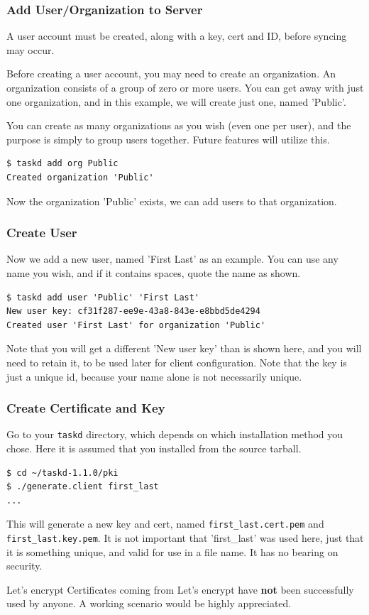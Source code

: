 \documentclass[t,handout]{beamer}
\begin{document}
\begin{frame}[fragile]\frametitle{Add User/Organization to Server}

    A user account must be created, along with a key, cert and ID, before syncing may occur.

    Before creating a user account, you may need to create an organization. An organization consists of a group of zero or more users. You can get away with just one organization, and in this example, we will create just one, named 'Public'.

    You can create as many organizations as you wish (even one per user), and the purpose is simply to group users together. Future features will utilize this.

    \begin{lstlisting}
$ taskd add org Public
Created organization 'Public'\end{lstlisting}

  Now the organization 'Public' exists, we can add users to that organization.
\end{frame}

\begin{frame}[fragile]\frametitle{Create User}
    Now we add a new user, named 'First Last' as an example.  You can use any name you wish, and if it contains spaces, quote the name as shown.

    \begin{lstlisting}
$ taskd add user 'Public' 'First Last'
New user key: cf31f287-ee9e-43a8-843e-e8bbd5de4294
Created user 'First Last' for organization 'Public'\end{lstlisting}

    Note that you will get a different 'New user key' than is shown here, and you will need to retain it, to be used later for client configuration.  Note that the key is just a unique id, because your name alone is not necessarily unique.
\end{frame}

\begin{frame}[fragile]\frametitle{Create Certificate and Key}

    Go to your \verb+taskd+ directory, which depends on which installation method you chose. Here it is assumed that you installed from the source tarball.

    \begin{lstlisting}
$ cd ~/taskd-1.1.0/pki
$ ./generate.client first_last
...\end{lstlisting}

    This will generate a new key and cert, named \verb+first_last.cert.pem+ and \verb+first_last.key.pem+. It is not important that 'first\_last' was used here, just that it is something unique, and valid for use in a file name. It has no bearing on security.

    \begin{alertblock}{Let's encrypt}
        Certificates coming from Let's encrypt have \textbf{not} been successfully used by anyone. A working scenario would be highly appreciated.
    \end{alertblock}
\end{frame}
\end{document}
